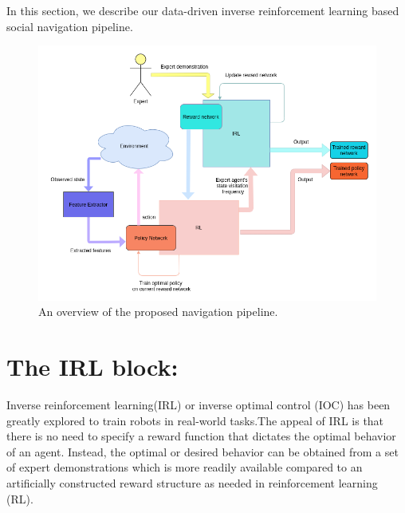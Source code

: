 \label{Ch:4}
In this section, we describe our data-driven inverse reinforcement learning based social navigation pipeline.\\

\begin{figure}[!htbp]
	\centering
	\includegraphics[width=\linewidth]{figures/irl_pipeline.png}
	\caption{An overview of the proposed navigation pipeline.}
	\label{fig:irl_pipeline}
\end{figure}

\section{The IRL block:}
Inverse reinforcement learning(IRL) or inverse optimal control (IOC) has been greatly explored to train robots in real-world tasks.The appeal of IRL is that there is no need to specify a reward function that dictates the optimal behavior of an agent. Instead, the optimal or desired behavior can be obtained from a set of expert demonstrations which is more readily available compared to an artificially constructed reward structure as needed in reinforcement learning (RL).

